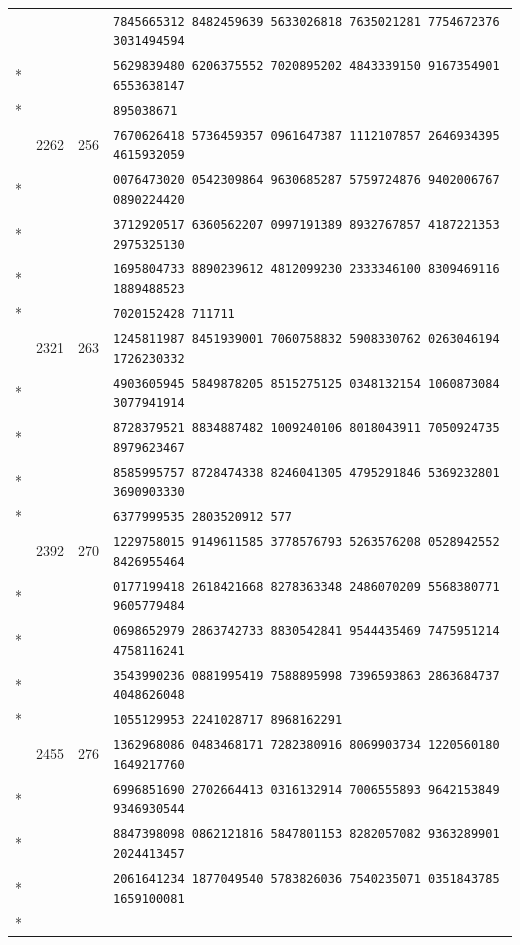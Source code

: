 \documentclass[10pt]{article}
\begin{document}
\begin{longtable}{@{}r@{\quad}r@{\quad}r@{\quad}l@{}}
 & &  & \texttt{7845665312 8482459639 5633026818 7635021281 7754672376 3031494594}\\*
 & &  & \texttt{5629839480 6206375552 7020895202 4843339150 9167354901 6553638147}\\*
 & &  & \texttt{895038671}\\
\addlinespace[2pt]
61 & 2262 & 256 & \texttt{7670626418 5736459357 0961647387 1112107857 2646934395 4615932059}\\*
 & &  & \texttt{0076473020 0542309864 9630685287 5759724876 9402006767 0890224420}\\*
 & &  & \texttt{3712920517 6360562207 0997191389 8932767857 4187221353 2975325130}\\*
 & &  & \texttt{1695804733 8890239612 4812099230 2333346100 8309469116 1889488523}\\*
 & &  & \texttt{7020152428 711711}\\
\addlinespace[2pt]
62 & 2321 & 263 & \texttt{1245811987 8451939001 7060758832 5908330762 0263046194 1726230332}\\*
 & &  & \texttt{4903605945 5849878205 8515275125 0348132154 1060873084 3077941914}\\*
 & &  & \texttt{8728379521 8834887482 1009240106 8018043911 7050924735 8979623467}\\*
 & &  & \texttt{8585995757 8728474338 8246041305 4795291846 5369232801 3690903330}\\*
 & &  & \texttt{6377999535 2803520912 577}\\
\addlinespace[2pt]
63 & 2392 & 270 & \texttt{1229758015 9149611585 3778576793 5263576208 0528942552 8426955464}\\*
 & &  & \texttt{0177199418 2618421668 8278363348 2486070209 5568380771 9605779484}\\*
 & &  & \texttt{0698652979 2863742733 8830542841 9544435469 7475951214 4758116241}\\*
 & &  & \texttt{3543990236 0881995419 7588895998 7396593863 2863684737 4048626048}\\*
 & &  & \texttt{1055129953 2241028717 8968162291}\\
\addlinespace[2pt]
64 & 2455 & 276 & \texttt{1362968086 0483468171 7282380916 8069903734 1220560180 1649217760}\\*
 & &  & \texttt{6996851690 2702664413 0316132914 7006555893 9642153849 9346930544}\\*
 & &  & \texttt{8847398098 0862121816 5847801153 8282057082 9363289901 2024413457}\\*
 & &  & \texttt{2061641234 1877049540 5783826036 7540235071 0351843785 1659100081}\\*

\end{longtable}
\end{document}
